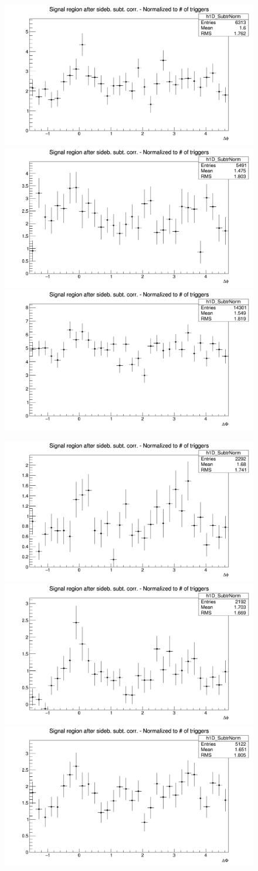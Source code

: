 \begin{figure}[!htbp]
\centering
{\includegraphics[width=0.31\linewidth, height=0.23\linewidth]{figures/Dzero/AzimCorrDistr_Dzero_Canvas_PtIntBins12to13_PoolInt_thrdot3to1dot.png}}
{\includegraphics[width=0.31\linewidth, height=0.23\linewidth]{figures/DplusPlotsweff/AzimCorrDistr_Dplus_Canvas_PtIntBins13to13_PoolInt_thrdot3to1dot.png}}
{\includegraphics[width=0.31\linewidth, height=0.23\linewidth]{figures/Dstar_wEFF/AzimCorrDistr_Dstar_Canvas_PtIntBins10to10_PoolInt_thrdot3to1dot.png}}


{\includegraphics[width=0.31\linewidth, height=0.23\linewidth]{figures/Dzero/AzimCorrDistr_Dzero_Canvas_PtIntBins12to13_PoolInt_thr1dotto2dot.png}}
{\includegraphics[width=0.31\linewidth, height=0.23\linewidth]{figures/DplusPlotsweff/AzimCorrDistr_Dplus_Canvas_PtIntBins13to13_PoolInt_thr1dotto2dot.png}}
{\includegraphics[width=0.31\linewidth, height=0.23\linewidth]{figures/Dstar_wEFF/AzimCorrDistr_Dstar_Canvas_PtIntBins10to10_PoolInt_thr1dotto2dot.png}}


\end{figure}
